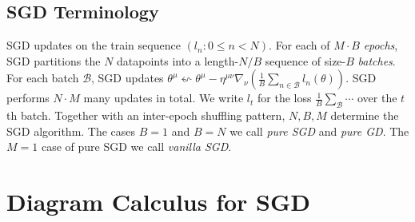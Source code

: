 \documentclass{article}
\newcommand{\Bb}{\mathcal{B}}
\newcommand{\wrap}[1]{\left(#1\right)}
\begin{document}
    \subsection{SGD Terminology}
        SGD updates on the train sequence $(l_n: 0\leq n<N)$.
        For each of $M\cdot B$ \emph{epochs}, SGD partitions the $N$ datapoints
        into a length-$N/B$ sequence of size-$B$ \emph{batches}.  For each
        batch $\Bb$, SGD updates
        $
            \theta^\mu
            \leftsquigarrow
            \theta^\mu -
            \eta^{\mu\nu} \nabla_\nu
                \wrap{\frac{1}{B} \sum_{n\in \Bb} l_n(\theta)}
        $.
        SGD performs $N\cdot M$ many updates in total.  We write $l_t$ for the
        loss $\frac{1}{B}\sum_\Bb\cdots$ over the $t$th batch. 
        Together with an
        inter-epoch shuffling pattern, $N, B, M$ determine the SGD algorithm.
        The cases $B=1$ and $B=N$ we call \emph{pure SGD} and \emph{pure GD}.
        The $M=1$ case of pure SGD we call \emph{vanilla SGD}.


\section{Diagram Calculus for SGD} \label{sect:calculus}

\end{document}
